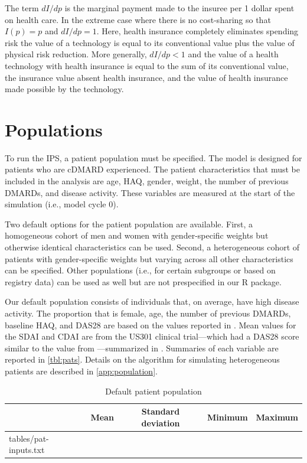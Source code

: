 \documentclass[11pt,final,fleqn]{article}\usepackage[]{graphicx}\usepackage[]{color}
\makeatletter
\theoremstyle{plain}
\newcommand*\ExpandableInput[1]{\@@input#1 }
\newcommand\R{{\textsf{R}}}
\makeatother
\begin{document}
The term $dI/dp$ is the marginal payment made to the insuree per 1 dollar spent on health care. In the extreme case where there is no cost-sharing so that $I(p) = p$ and $dI/dp = 1$. Here, health insurance completely eliminates spending risk the value of a technology is equal to its conventional value plus the value of physical risk reduction. More generally, $dI/dp < 1$ and the value of a health technology with health insurance is equal to the sum of its conventional value, the insurance value absent health insurance, and the value of health insurance made possible by the technology. 

\section{Populations}\label{sec:populations}
To run the IPS, a patient population must be specified. The model is designed for patients who are cDMARD experienced. The patient characteristics that must be included in the analysis are age, HAQ, gender, weight, the number of previous DMARDs, and disease activity. These variables are measured at the start of the simulation (i.e., model cycle 0).  

Two default options for the patient population are available. First, a homogeneous cohort of men and women with gender-specific weights but otherwise identical characteristics can be used. Second, a heterogeneous cohort of patients with gender-specific weights but varying across all other characteristics can be specified. Other populations (i.e., for certain subgroups or based on registry data) can be used as well but are not prespecified in our \R{} package. 



Our default population consists of individuals that, on average, have high disease activity. The proportion that is female, age, the number of previous DMARDs, baseline HAQ, and DAS28 are based on the values reported in \citet{curtis2010comparison}. Mean values for the SDAI and CDAI are from the US301 clinical trial---which had a DAS28 score similar to the value from \citet{curtis2010comparison}---summarized in \citet{smolen2003simplified}. Summaries of each variable are reported in \autoref{tbl:pats}. Details on the algorithm for simulating heterogeneous patients are described in \autoref{app:population}.

\begin{table}[!ht]
\begin{center}
\begin{threeparttable}
\caption{Default patient population} \label{tbl:pats}
\begin{tabularx}{\textwidth}{@{\extracolsep{\fill}}lcccc}
\hline
\multicolumn{1}{l}{} & \multicolumn{1}{c}{Mean} & \multicolumn{1}{c}{Standard deviation} & \multicolumn{1}{c}{Minimum} & \multicolumn{1}{c}{Maximum}\\
\hline
\ExpandableInput{tables/pat-inputs.txt}
\hline
\end{tabularx}
\scriptsize
\end{threeparttable}
\end{center}
\end{table}
\end{document}
